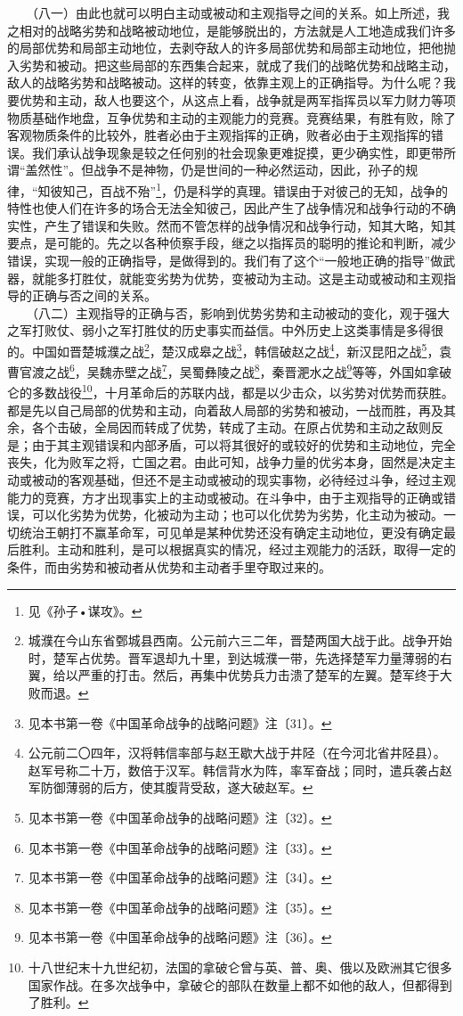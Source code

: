 \documentclass[cn,11pt,chinese]{elegantbook}
\begin{document}
　　（八一）由此也就可以明白主动或被动和主观指导之间的关系。如上所述，我之相对的战略劣势和战略被动地位，是能够脱出的，方法就是人工地造成我们许多的局部优势和局部主动地位，去剥夺敌人的许多局部优势和局部主动地位，把他抛入劣势和被动。把这些局部的东西集合起来，就成了我们的战略优势和战略主动，敌人的战略劣势和战略被动。这样的转变，依靠主观上的正确指导。为什么呢？我要优势和主动，敌人也要这个，从这点上看，战争就是两军指挥员以军力财力等项物质基础作地盘，互争优势和主动的主观能力的竞赛。竞赛结果，有胜有败，除了客观物质条件的比较外，胜者必由于主观指挥的正确，败者必由于主观指挥的错误。我们承认战争现象是较之任何别的社会现象更难捉摸，更少确实性，即更带所谓“盖然性”。但战争不是神物，仍是世间的一种必然运动，因此，孙子的规律，“知彼知己，百战不殆”\footnote[24]{ 见《孙子•谋攻》。}，仍是科学的真理。错误由于对彼己的无知，战争的特性也使人们在许多的场合无法全知彼己，因此产生了战争情况和战争行动的不确实性，产生了错误和失败。然而不管怎样的战争情况和战争行动，知其大略，知其要点，是可能的。先之以各种侦察手段，继之以指挥员的聪明的推论和判断，减少错误，实现一般的正确指导，是做得到的。我们有了这个“一般地正确的指导”做武器，就能多打胜仗，就能变劣势为优势，变被动为主动。这是主动或被动和主观指导的正确与否之间的关系。\\
　　（八二）主观指导的正确与否，影响到优势劣势和主动被动的变化，观于强大之军打败仗、弱小之军打胜仗的历史事实而益信。中外历史上这类事情是多得很的。中国如晋楚城濮之战\footnote[25]{ 城濮在今山东省鄄城县西南。公元前六三二年，晋楚两国大战于此。战争开始时，楚军占优势。晋军退却九十里，到达城濮一带，先选择楚军力量薄弱的右翼，给以严重的打击。然后，再集中优势兵力击溃了楚军的左翼。楚军终于大败而退。}，楚汉成皋之战\footnote[26]{ 见本书第一卷《中国革命战争的战略问题》注〔31〕。}，韩信破赵之战\footnote[27]{ 公元前二〇四年，汉将韩信率部与赵王歇大战于井陉（在今河北省井陉县）。赵军号称二十万，数倍于汉军。韩信背水为阵，率军奋战；同时，遣兵袭占赵军防御薄弱的后方，使其腹背受敌，遂大破赵军。}，新汉昆阳之战\footnote[28]{ 见本书第一卷《中国革命战争的战略问题》注〔32〕。}，袁曹官渡之战\footnote[29]{ 见本书第一卷《中国革命战争的战略问题》注〔33〕。}，吴魏赤壁之战\footnote[30]{ 见本书第一卷《中国革命战争的战略问题》注〔34〕。}，吴蜀彝陵之战\footnote[31]{ 见本书第一卷《中国革命战争的战略问题》注〔35〕。}，秦晋淝水之战\footnote[32]{ 见本书第一卷《中国革命战争的战略问题》注〔36〕。}等等，外国如拿破仑的多数战役\footnote[33]{ 十八世纪末十九世纪初，法国的拿破仑曾与英、普、奥、俄以及欧洲其它很多国家作战。在多次战争中，拿破仑的部队在数量上都不如他的敌人，但都得到了胜利。}，十月革命后的苏联内战，都是以少击众，以劣势对优势而获胜。都是先以自己局部的优势和主动，向着敌人局部的劣势和被动，一战而胜，再及其余，各个击破，全局因而转成了优势，转成了主动。在原占优势和主动之敌则反是；由于其主观错误和内部矛盾，可以将其很好的或较好的优势和主动地位，完全丧失，化为败军之将，亡国之君。由此可知，战争力量的优劣本身，固然是决定主动或被动的客观基础，但还不是主动或被动的现实事物，必待经过斗争，经过主观能力的竞赛，方才出现事实上的主动或被动。在斗争中，由于主观指导的正确或错误，可以化劣势为优势，化被动为主动；也可以化优势为劣势，化主动为被动。一切统治王朝打不赢革命军，可见单是某种优势还没有确定主动地位，更没有确定最后胜利。主动和胜利，是可以根据真实的情况，经过主观能力的活跃，取得一定的条件，而由劣势和被动者从优势和主动者手里夺取过来的。\\
\end{document}
